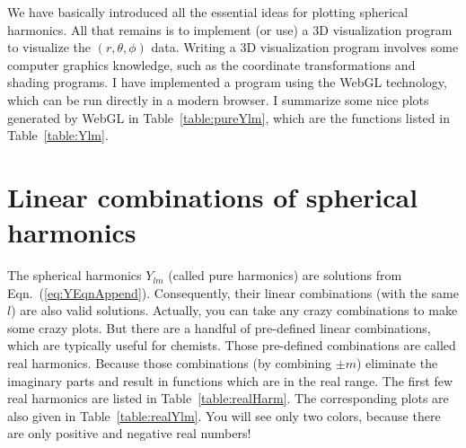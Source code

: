 We have basically introduced all the essential ideas for plotting spherical
harmonics. All that remains is to implement (or use) a 3D visualization program
to visualize the $(r,\theta,\phi)$ data. Writing a 3D visualization program
involves some computer graphics knowledge, such as the coordinate transformations
and shading programs. I have implemented a program using the WebGL technology,
which can be run directly in a modern browser. I summarize some nice plots generated
by WebGL in Table~\ref{table:pureYlm}, which are the functions listed in Table~\ref{table:Ylm}.

\section{Linear combinations of spherical harmonics}
The spherical harmonics $Y_{lm}$ (called pure harmonics)
are solutions from Eqn.~(\ref{eq:YEqnAppend}).
Consequently, their linear combinations (with the same $l$) are also valid solutions.
Actually, you can take any crazy combinations to make some crazy plots.
But there are a handful of pre-defined linear combinations, which are
typically useful for chemists. Those pre-defined
combinations are called real harmonics. Because those
combinations (by combining $\pm m$)
eliminate the imaginary parts and result in
functions which are in the real range. The first few real harmonics
are listed in Table~\ref{table:realHarm}. The corresponding plots
are also given in Table~\ref{table:realYlm}. You will see only two
colors, because there are only positive and negative real numbers!

